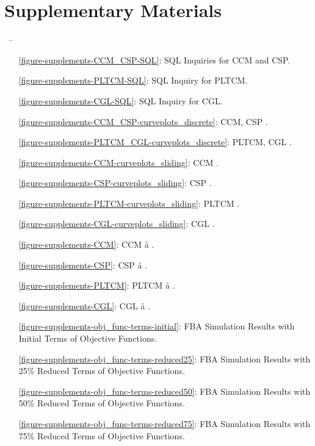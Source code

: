 \chapter*{Supplementary Materials}\label{Supp_first}
%
{\thepage\ -- \pageref{LastPage}}

\captionsetup{list=no}
\begin{itemize}
	\item[\ref{figure-supplements-CCM_CSP-SQL}:] SQL Inquiries for CCM and CSP.
	\item[\ref{figure-supplements-PLTCM-SQL}:] SQL Inquiry for PLTCM.
	\item[\ref{figure-supplements-CGL-SQL}:] SQL Inquiry for CGL.
	\item[\ref{figure-supplements-CCM_CSP-curveplots_discrete}:] CCM, CSP \cc{} \ee{}.
	\item[\ref{figure-supplements-PLTCM_CGL-curveplots_discrete}:] PLTCM, CGL \cc{} \ee{}.
	\item[\ref{figure-supplements-CCM-curveplots_sliding}:] CCM \cc{} \dd{}.
	\item[\ref{figure-supplements-CSP-curveplots_sliding}:] CSP \cc{} \dd{}.
	\item[\ref{figure-supplements-PLTCM-curveplots_sliding}:] PLTCM \cc{} \dd{}.
	\item[\ref{figure-supplements-CGL-curveplots_sliding}:] CGL \cc{} \dd{}.
	\item[\ref{figure-supplements-CCM}:] CCM \aa{} \bb{}.
	\item[\ref{figure-supplements-CSP}:] CSP \aa{} \bb{}.
	\item[\ref{figure-supplements-PLTCM}:] PLTCM \aa{} \bb{}.
	\item[\ref{figure-supplements-CGL}:] CGL \aa{} \bb{}.
	\item[\ref{figure-supplements-obj_func-terms-initial}:] FBA Simulation Results with Initial Terms of Objective Functions.
	\item[\ref{figure-supplements-obj_func-terms-reduced25}:] FBA Simulation Results with 25\% Reduced Terms of Objective Functions.
	\item[\ref{figure-supplements-obj_func-terms-reduced50}:] FBA Simulation Results with 50\% Reduced Terms of Objective Functions.
	\item[\ref{figure-supplements-obj_func-terms-reduced75}:] FBA Simulation Results with 75\% Reduced Terms of Objective Functions.
\end{itemize}
\clearpage

